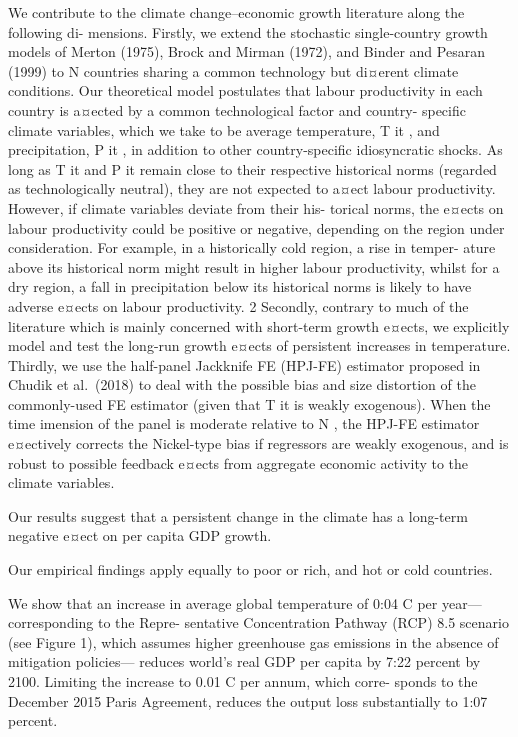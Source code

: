 \documentclass[
]{book}
\begin{document}
We contribute to the climate change--economic growth literature along the following di-
mensions. Firstly, we extend the stochastic single-country growth models of Merton (1975),
Brock and Mirman (1972), and Binder and Pesaran (1999) to N countries sharing a common
technology but di¤erent climate conditions. Our theoretical model postulates that labour
productivity in each country is a¤ected by a common technological factor and country-
specific climate variables, which we take to be average temperature, T it , and precipitation,
P it , in addition to other country-specific idiosyncratic shocks. As long as T it and P it remain
close to their respective historical norms (regarded as technologically neutral), they are not
expected to a¤ect labour productivity. However, if climate variables deviate from their his-
torical norms, the e¤ects on labour productivity could be positive or negative, depending on
the region under consideration. For example, in a historically cold region, a rise in temper-
ature above its historical norm might result in higher labour productivity, whilst for a dry
region, a fall in precipitation below its historical norms is likely to have adverse e¤ects on
labour productivity. 2 Secondly, contrary to much of the literature which is mainly concerned
with short-term growth e¤ects, we explicitly model and test the long-run growth e¤ects of
persistent increases in temperature. Thirdly, we use the half-panel Jackknife FE (HPJ-FE)
estimator proposed in Chudik et al.~(2018) to deal with the possible bias and size distortion
of the commonly-used FE estimator (given that T it is weakly exogenous). When the time
imension of the panel is moderate relative to N , the HPJ-FE estimator e¤ectively corrects
the Nickel-type bias if regressors are weakly exogenous, and is robust to possible feedback
e¤ects from aggregate economic activity to the climate variables.

Our results suggest that a persistent change
in the climate has a long-term negative e¤ect on per capita GDP growth.

Our empirical findings
apply equally to poor or rich, and hot or cold countries.

We show that
an increase in average global temperature of 0:04 C per year--- corresponding to the Repre-
sentative Concentration Pathway (RCP) 8.5 scenario (see Figure 1), which assumes higher
greenhouse gas emissions in the absence of mitigation policies--- reduces world's real GDP
per capita by 7:22 percent by 2100. Limiting the increase to 0.01 C per annum, which corre-
sponds to the December 2015 Paris Agreement, reduces the output loss substantially to 1:07
percent.
\end{document}
